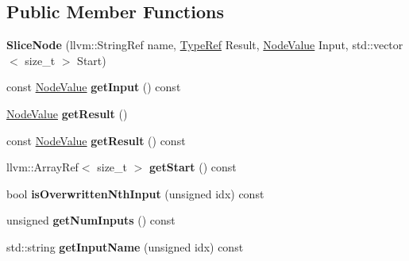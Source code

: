 \subsection*{Public Member Functions}
\begin{DoxyCompactItemize}
\item 
\mbox{\label{classglow_1_1_slice_node_afe9b66035c30bdd28dc4fb7f26add851}} 
{\bfseries Slice\+Node} (llvm\+::\+String\+Ref name, \hyperlink{structglow_1_1_type}{Type\+Ref} Result, \hyperlink{structglow_1_1_node_value}{Node\+Value} Input, std\+::vector$<$ size\+\_\+t $>$ Start)
\item 
\mbox{\label{classglow_1_1_slice_node_ae88712815ee4b01383f18e50c0f0a5be}} 
const \hyperlink{structglow_1_1_node_value}{Node\+Value} {\bfseries get\+Input} () const
\item 
\mbox{\label{classglow_1_1_slice_node_a799390825ad8056f73856db600345364}} 
\hyperlink{structglow_1_1_node_value}{Node\+Value} {\bfseries get\+Result} ()
\item 
\mbox{\label{classglow_1_1_slice_node_aa077f24b1c7e7847fdea161b33679011}} 
const \hyperlink{structglow_1_1_node_value}{Node\+Value} {\bfseries get\+Result} () const
\item 
\mbox{\label{classglow_1_1_slice_node_a0b7330cac8b0b0c0d483626a888de30f}} 
llvm\+::\+Array\+Ref$<$ size\+\_\+t $>$ {\bfseries get\+Start} () const
\item 
\mbox{\label{classglow_1_1_slice_node_a3b66cc1cb7210e421aee717f4f5d4b90}} 
bool {\bfseries is\+Overwritten\+Nth\+Input} (unsigned idx) const
\item 
\mbox{\label{classglow_1_1_slice_node_a959cc691d0c689913499404ccefc5c81}} 
unsigned {\bfseries get\+Num\+Inputs} () const
\item 
\mbox{\label{classglow_1_1_slice_node_a4d94abed7b43d6150482ebe4e58dc33d}} 
std\+::string {\bfseries get\+Input\+Name} (unsigned idx) const
\item 
\mbox{\label{classglow_1_1_slice_node_a42391ec9c6cc1cf19546461c00a018cc}} 

\end{DoxyCompactItemize}

